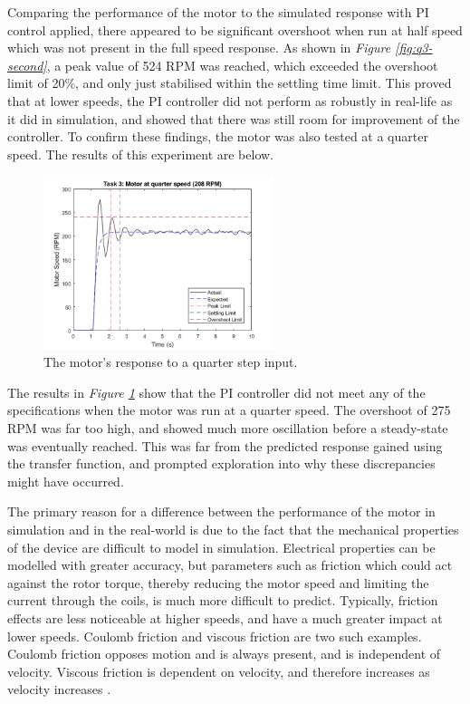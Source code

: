 \documentclass[11pt, onecolumn]{article}
\begin{document}
\par Comparing the performance of the motor to the simulated response with PI control applied, there appeared to be significant overshoot when run at half speed which was not present in the full speed response. As shown in \textit{Figure \ref{fig:q3-second}}, a peak value of 524 RPM was reached, which exceeded the overshoot limit of 20\%, and only just stabilised within the settling time limit. This proved that at lower speeds, the PI controller did not perform as robustly in real-life as it did in simulation, and showed that there was still room for improvement of the controller. To confirm these findings, the motor was also tested at a quarter speed. The results of this experiment are below.
\begin{figure}[h!]
    \centering
    \includegraphics[width=0.6\textwidth]{q3-g3.png}
    \caption{The motor's response to a quarter step input.}
    \label{fig:q3-third}
\end{figure}
\par The results in \textit{Figure \ref{fig:q3-third}} show that the PI controller did not meet any of the specifications when the motor was run at a quarter speed. The overshoot of 275 RPM was far too high, and showed much more oscillation before a steady-state was eventually reached. This was far from the predicted response gained using the transfer function, and prompted exploration into why these discrepancies might have occurred.
\par The primary reason for a difference between the performance of the motor in simulation and in the real-world is due to the fact that the mechanical properties of the device are difficult to model in simulation. Electrical properties can be modelled with greater accuracy, but parameters such as friction which could act against the rotor torque, thereby reducing the motor speed and limiting the current through the coils, is much more difficult to predict. Typically, friction effects are less noticeable at higher speeds, and have a much greater impact at lower speeds. Coulomb friction and viscous friction are two such examples. Coulomb friction opposes motion and is always present, and is independent of velocity. Viscous friction is dependent on velocity, and therefore increases as velocity increases \cite{Virgala2013}.
\end{document}
